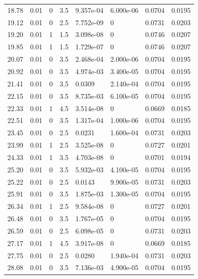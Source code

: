 \documentclass[preview]{standalone}
\begin{document}
{{\begin{tabular}{L{1.2cm}C{1.2cm} C{0.3cm}C{0.5cm} C{1.4cm}C{1.4cm} C{1.4cm}C{1.4cm}}
  18.78  &  0.01  & 0     & 3.5 &  9.357e-04  & 6.000e-06  & 0.0704 &  0.0195   \\ 
  19.12  &  0.01  & 0     & 2.5 &  7.752e-09  & 0  & 0.0731 &  0.0203   \\ 
  19.20  &  0.01  & 1     & 1.5 &  3.098e-08  & 0  & 0.0746 &  0.0207   \\ 
  19.85  &  0.01  & 1     & 1.5 &  1.729e-07  & 0  & 0.0746 &  0.0207   \\ 
  20.07  &  0.01  & 0     & 3.5 &  2.468e-04  & 2.000e-06  & 0.0704 &  0.0195   \\ 
  20.92  &  0.01  & 0     & 3.5 &  4.974e-03  & 3.400e-05  & 0.0704 &  0.0195   \\ 
  21.41  &  0.01  & 0     & 3.5 &  0.0309  & 2.140e-04  & 0.0704 &  0.0195   \\ 
  22.15  &  0.01  & 0     & 3.5 &  8.735e-03  & 6.100e-05  & 0.0704 &  0.0195   \\ 
  22.33  &  0.01  & 1     & 4.5 &  3.514e-08  & 0  & 0.0669 &  0.0185   \\ 
  22.51  &  0.01  & 0     & 3.5 &  1.317e-04  & 1.000e-06  & 0.0704 &  0.0195   \\ 
  23.45  &  0.01  & 0     & 2.5 &  0.0231  & 1.600e-04  & 0.0731 &  0.0203   \\ 
  23.99  &  0.01  & 1     & 2.5 &  3.525e-08  & 0  & 0.0727 &  0.0201   \\ 
  24.33  &  0.01  & 1     & 3.5 &  4.703e-08  & 0  & 0.0701 &  0.0194   \\ 
  25.20  &  0.01  & 0     & 3.5 &  5.932e-03  & 4.100e-05  & 0.0704 &  0.0195   \\ 
  25.22  &  0.01  & 0     & 2.5 &  0.0143  & 9.900e-05  & 0.0731 &  0.0203   \\ 
  25.91  &  0.01  & 0     & 3.5 &  1.875e-03  & 1.300e-05  & 0.0704 &  0.0195   \\ 
  26.34  &  0.01  & 1     & 2.5 &  9.584e-08  & 0  & 0.0727 &  0.0201   \\ 
  26.48  &  0.01  & 0     & 3.5 &  1.767e-05  & 0  & 0.0704 &  0.0195   \\ 
  26.59  &  0.01  & 0     & 2.5 &  6.098e-05  & 0  & 0.0731 &  0.0203   \\ 
  27.17  &  0.01  & 1     & 4.5 &  3.917e-08  & 0  & 0.0669 &  0.0185   \\ 
  27.75  &  0.01  & 0     & 2.5 &  0.0280  & 1.940e-04  & 0.0731 &  0.0203   \\ 
  28.08  &  0.01  & 0     & 3.5 &  7.136e-03  & 4.900e-05  & 0.0704 &  0.0195   \\ 

\end{tabular}}}
\end{document}
